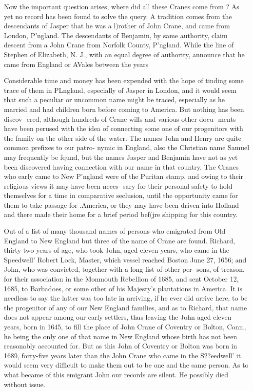 \documentclass[oneside]{book}
\begin{document}
Now the important question arises, where did all these Cranes 
come from ? As yet no record has been found to solve the query. 
A tradition comes from the descendants of Jasper that he was a 
l)rother of John Crane, and came from London, P'ngland. The 
descendants of Benjamin, by same authority, claim descent from 
a John Crane from Norfolk County, P'ngland. While the line of 
Stephen of Elizabeth, N. J., with an equal degree of authority, 
announce that he came from England or AVales between the years 




Considerable time and money has been expended with the hope 
of tinding some trace of them in PLngland, especially of Jasper in 
London, and it would seem that such a peculiar or uncommon 
name might be traced, especially as he married and had children 
born before coming to America. But nothing has been discov- 
ered, although hundreds of Crane wills and various other docu- 
ments have been perused with the idea of connecting some one of 
our progenitors with the family on the other side of the water. 
The names John and Henry are quite common prefixes to our patro- 
nymic in England, also the Christian name Samuel may frequently 
be fqund, but the names Jasper and Benjamin have not as yet 
been discovered having connection with our name in that country. 
The Cranes who early came to New P'ngland were of the Puritan 
stamp, and owing to their religious views it may have been neces- 
sary for their personal safety to hold themselves for a time in 
comparative seclusion, until the opportunity came for them to 
take passage for .America, or they may have been driven into 
Holland and there made their home for a brief period bef(jre 
shipping for this country. 

Out of a list of many thousand names of persons who emigrated 
from Old England to New England but three of the name of 
Crane are found. Richard, thirty-two years of age, who took 
John, aged eleven years, who came in the Speedwell' Robert 
Lock, Master, which vessel reached Boston June 27, 1656; and 
John, who was convicted, together with a long list of other per- 
sons, of treason, for their association in the Monmouth Rebellion 
of 1685, and sent October 12, 1685, to Barbadoes, or some other 
of his Majesty's plantations in America. It is needless to say the 
latter was too late in arriving, if he ever did arrive here, to be 
the progenitor of any of our New England families, and as to 
Richard, that name does not appear among our early settlers, 
thus leaving the John aged eleven years, born in 1645, to fill the 
place of John Crane of Coventry or Bolton, Conn., he being the 
only one of that name in New England whose birth has not been 
reasonably accounted for. But as this John of Coventry or 
Bolton was born in 1689, forty-five years later than the John 
Crane who came in the S2?eedwell' it would seem very difficult to 
make them out to be one and the same person. As to what 
became of this emigrant John our records are silent. He possibly 
died without issue. 
\end{document}
